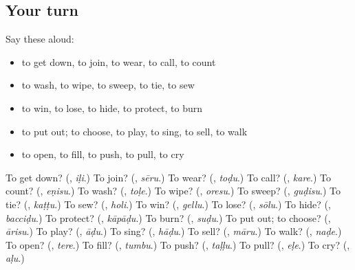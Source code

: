 \subsection*{Your turn}
Say these aloud:

\begin{itemize}
\raggedright
  \item to get down, to join, to wear, to call, to count
  \item to wash, to wipe, to sweep, to tie, to sew
  \item to win, to lose, to hide, to protect, to burn
  \item to put out; to choose, to play, to sing, to sell, to walk
  \item to open, to fill, to push, to pull, to cry
\end{itemize}

\begin{tcolorbox}[breakable,colback=teal!4,colframe=teal!35!black,title={Before you move on}]
To get down? (\textbf{}, \emph{iḷi}.) To join? (\textbf{}, \emph{sēru}.) To wear? (\textbf{}, \emph{toḍu}.) To call? (\textbf{}, \emph{kare}.) To count? (\textbf{}, \emph{eṇisu}.) To wash? (\textbf{}, \emph{toḷe}.) To wipe? (\textbf{}, \emph{oresu}.) To sweep? (\textbf{}, \emph{guḍisu}.) To tie? (\textbf{}, \emph{kaṭṭu}.) To sew? (\textbf{}, \emph{holi}.) To win? (\textbf{}, \emph{gellu}.) To lose? (\textbf{}, \emph{sōlu}.) To hide? (\textbf{}, \emph{bacciḍu}.) To protect? (\textbf{}, \emph{kāpāḍu}.) To burn? (\textbf{}, \emph{suḍu}.) To put out; to choose? (\textbf{}, \emph{ārisu}.) To play? (\textbf{}, \emph{āḍu}.) To sing? (\textbf{}, \emph{hāḍu}.) To sell? (\textbf{}, \emph{māru}.) To walk? (\textbf{}, \emph{naḍe}.) To open? (\textbf{}, \emph{tere}.) To fill? (\textbf{}, \emph{tumbu}.) To push? (\textbf{}, \emph{taḷḷu}.) To pull? (\textbf{}, \emph{eḷe}.) To cry? (\textbf{}, \emph{aḷu}.)
\end{tcolorbox}
